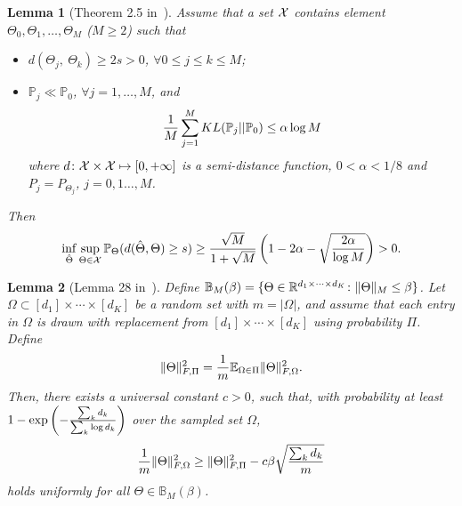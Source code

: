 \documentclass[11pt]{article}
\theoremstyle{plain}
\newtheorem{lem}{Lemma}
\theoremstyle{definition}
\begin{document}
\begin{lem}[Theorem 2.5 in~\cite{tsybakov2009introduction}]\label{lem:Tsybakov}
Assume that a set $\mathcal{X}$ contains element $\Theta_0, \Theta_1, \ldots,\Theta_M$ ($M\geq 2$) such that
\begin{itemize}
\item $d(\Theta_j,\ \Theta_k)\geq 2s>0$, $\forall 0\leq j\leq k\leq M$;
\item $\mathbb{P}_j\ll\mathbb{P}_0$, $\forall j=1,\ldots,M$, and
\[
{1\over M}\sum_{j=1}^M KL(\mathbb{P}_j||\mathbb{P}_0)\leq \alpha \log M
\]
where $d\colon \mathcal{X}\times \mathcal{X}\mapsto [0,+\infty]$ is a semi-distance function, $0<\alpha<{1/8}$ and $P_j=P_{\Theta_j}$, $j=0,1\ldots,M$.
\end{itemize}
Then
\[
\inf_{\hat \Theta}\sup_{\Theta\in\mathcal{X}} \mathbb{P}_{\Theta}(d(\hat \Theta, \Theta)\geq s)\geq {\sqrt{M}\over 1+\sqrt{M}}\left(1-2\alpha-\sqrt{2\alpha\over \log M} \right)>0.
\]
\end{lem}

\begin{lem}[Lemma 28 in~\cite{ghadermarzy2019near}]\label{lem:convexity}
Define $\mathbb{B}_{M}(\beta)=\{\Theta\in \mathbb{R}^{d_1\times \cdots \times d_K}\colon \lVert\Theta\rVert_M\leq \beta \}$.  Let $\Omega\subset[d_1]\times\cdots \times [d_K]$ be a random set with $m=|\Omega|$, and assume that each entry in $\Omega$ is drawn with replacement from $[d_1]\times\cdots\times[d_K]$ using probability $\Pi$. Define
\[
\lVert\Theta\rVert_{F,\Pi}^2={1\over m}\mathbb{E}_{\Omega\in\Pi}\lVert\Theta\rVert_{F,\Omega}^2.
\]
Then, there exists a universal constant $c>0$, such that, with probability at least $1-\exp\left(-{\sum_kd_k \over \sum_k \log d_k} \right)$ over the sampled set $\Omega$,
\[
{1\over m}\lVert\Theta\rVert_{F,\Omega}^2 \geq \lVert\Theta\rVert_{F,\Pi}^2-c\beta\sqrt{\sum_k d_k\over m}
\]
holds uniformly for all $\Theta\in\mathbb{B}_M(\beta)$.
\end{lem}
\end{document}
